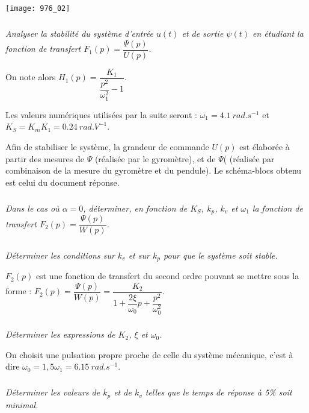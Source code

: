 \begin{center}
\texttt{[image: 976\_02]}%
\end{center}


\subparagraph{}
\textit{Analyser la stabilité du système d’entrée $u(t)$ et de sortie $\psi(t)$ en étudiant la fonction de transfert $F_1(p)=\dfrac{\Psi(p)}{U(p)}$.}%
\ifprof
\begin{corrige}
\end{corrige}
\else
\fi


On note alors $H_1(p)=\dfrac{K_1}{\dfrac{p^2}{\omega_1^2} - 1}$. 

Les valeurs numériques utilisées par la suite seront : $\omega_1=\SI{4,1}{rad.s^{-1}}$ et
$K_S = K_mK_1 = \SI{0,24}{rad.V^{-1}}$.

Afin de stabiliser le système, la grandeur de commande $U(p)$ est élaborée à partir des mesures de $\dot{\Psi}$ (réalisée par le gyromètre), et de ${\Psi}$( (réalisée par combinaison de la mesure du gyromètre et du pendule). Le schéma-blocs obtenu est celui du document réponse.


\subparagraph{}
\textit{Dans le cas où $\alpha = 0$, déterminer, en fonction de $K_S$, $k_p$, $k_v$ et $\omega_1$ la
fonction de transfert $F_2(p)=\dfrac{\Psi(p)}{W(p)}$.}
\ifprof
\begin{corrige}
\end{corrige}
\else
\fi



\subparagraph{}
\textit{Déterminer les conditions sur $k_v$ et sur $k_p$ pour que le système soit stable.}
\ifprof
\begin{corrige}
\end{corrige}
\else
\fi

$F_2(p)$ est une fonction de transfert du second ordre pouvant se mettre sous la forme :
$F_2(p)=\dfrac{\Psi(p)}{W(p)}=\dfrac{K_2}{1+\dfrac{2\xi}{\omega_0}p+\dfrac{p^2}{\omega_0^2}}$.


\subparagraph{}
\textit{Déterminer les expressions de $K_2$, $\xi$ et $\omega_0$.}
\ifprof
\begin{corrige}
\end{corrige}
\else
\fi

On choisit une pulsation propre proche de celle du système mécanique, c’est
à dire $\omega_0 = 1,5\omega_1=\SI{6,15}{rad.s^{-1}}$.



\subparagraph{}
\textit{Déterminer les valeurs de $k_p$ et de $k_v$ telles que le temps de réponse à 5\% soit minimal.}
\ifprof
\begin{corrige}
\end{corrige}
\else
\fi



